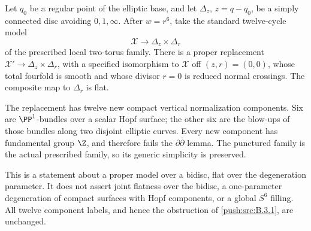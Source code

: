 \begin{proposition}\label{push:src:B.4.15}\label{push:B415}

Let $q_0$ be a regular point of the elliptic base, and let
$\Delta_z$, $z=q-q_0$, be a simply connected disc avoiding
$0,1,\infty$. After $w=r^6$, take the standard twelve-cycle
model
\[
 \mathcal X\longrightarrow\Delta_z\times\Delta_r
\]
of the prescribed local two-torus family. There is a proper
replacement $\mathcal X'\to\Delta_z\times\Delta_r$, with
a specified isomorphism to $\mathcal X$ off $(z,r)=(0,0)$,
whose total fourfold is smooth and whose divisor $r=0$ is
reduced normal crossings. The composite map to $\Delta_r$
is flat.

The replacement has twelve new compact vertical normalization
components. Six are $\PP^1$-bundles over a scalar Hopf
surface; the other six are the blow-ups of those bundles
along two disjoint elliptic curves. Every new component
has fundamental group $\Z$, and therefore fails the
$\partial\bar\partial$ lemma. The punctured family is the
actual prescribed family, so its generic simplicity is
preserved.

This is a statement about a proper model over a bidisc,
flat over the degeneration parameter. It does not assert
joint flatness over the bidisc, a one-parameter degeneration
of compact surfaces with Hopf components, or a global
$S^6$ filling. All twelve component labels, and hence the
obstruction of \ref{push:src:B.3.1}, are unchanged.
\end{proposition}



